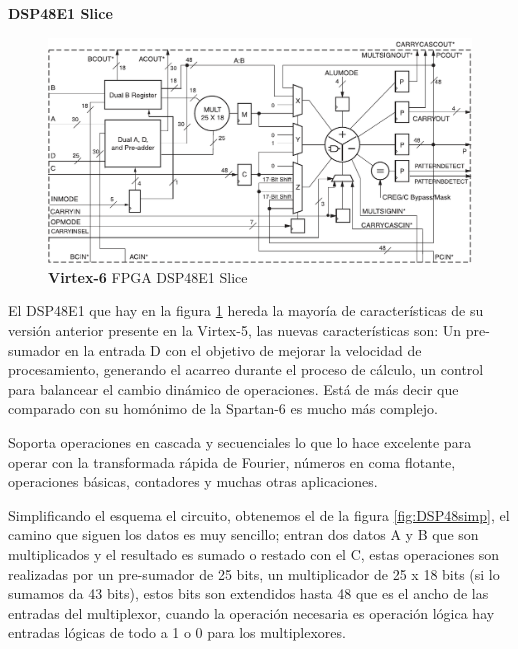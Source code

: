 \documentclass[11pt,a4paper]{article}
\begin{document}
{\Large \textbf{DSP48E1 Slice}}

\begin{figure}[h]
    \centering
    \includegraphics[scale=0.6]{images/DSP48E1.pdf}
    \caption{\textbf{Virtex-6} FPGA DSP48E1 Slice}
    \label{fig:DSO48E1}
\end{figure}

El DSP48E1 que hay en la figura \ref{fig:DSO48E1} hereda la mayoría de características de su versión anterior presente en la Virtex-5, las nuevas características son: Un pre-sumador en la entrada D con el objetivo de mejorar la velocidad de procesamiento, generando el acarreo durante el proceso de cálculo, un control para balancear el cambio dinámico de operaciones. Está de más decir que comparado con su homónimo de la Spartan-6 es mucho más complejo.

Soporta operaciones en cascada y secuenciales lo que lo hace excelente para operar con la transformada rápida de Fourier, números en coma flotante, operaciones básicas, contadores y muchas otras aplicaciones.\par
\begin{figure}
\end{figure}\par
Simplificando el esquema el circuito, obtenemos el de la figura \ref{fig:DSP48simp}, el camino que siguen los datos es muy sencillo; entran dos datos A y B que son multiplicados y el resultado es sumado o restado con el C, estas operaciones son realizadas por un pre-sumador de 25 bits, un multiplicador de 25 x 18 bits (si lo sumamos da 43 bits), estos bits son extendidos hasta 48 que es el ancho de las entradas del multiplexor, cuando la operación necesaria es operación lógica hay entradas lógicas de todo a 1 o 0 para los multiplexores.

\fontsize{7.5}{1.2}\selectfont
\nocite{*}


\end{document}
